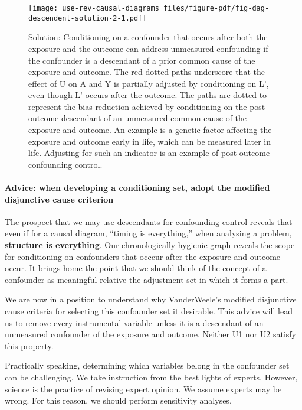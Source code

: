 \documentclass[
  singlecolumn,
  9pt]{article}
\let\oldparagraph\paragraph
\renewcommand{\paragraph}[1]{\oldparagraph{#1}\mbox{}}
\begin{document}
\begin{figure}

{\centering \texttt{[image: use-rev-causal-diagrams\_files/figure-pdf/fig-dag-descendent-solution-2-1.pdf]}

}

\caption{\label{fig-dag-descendent-solution-2}Solution: Conditioning on
a confounder that occurs after both the exposure and the outcome can
address unmeasured confounding if the confounder is a descendant of a
prior common cause of the exposure and outcome. The red dotted paths
underscore that the effect of U on A and Y is partially adjusted by
conditioning on L', even though L' occurs after the outcome. The paths
are dotted to represent the bias reduction achieved by conditioning on
the post-outcome descendant of an unmeasured common cause of the
exposure and outcome. An example is a genetic factor affecting the
exposure and outcome early in life, which can be measured later in life.
Adjusting for such an indicator is an example of post-outcome
confounding control.}

\end{figure}

\paragraph{Advice: when developing a conditioning set, adopt the
modified disjunctive cause
criterion}\label{advice-when-developing-a-conditioning-set-adopt-the-modified-disjunctive-cause-criterion}

The prospect that we may use descendants for confounding control reveals
that even if for a causal diagram, ``timing is everything,'' when
analysing a problem, \textbf{structure is everything}. Our
chronologically hygienic graph reveals the scope for conditioning on
confounders that occcur after the exposure and outcome occur. It brings
home the point that we should think of the concept of a confounder as
meaningful relative the adjustment set in which it forms a part.

We are now in a position to understand why VanderWeele's modified
disjunctive cause criteria for selecting this confounder set it
desirable. This advice will lead us to remove every instrumental
variable unless it is a descendant of an unmeasured confounder of the
exposure and outcome. Neither U1 nor U2 satisfy this property.

Practically speaking, determining which variables belong in the
confounder set can be challenging. We take instruction from the best
lights of experts. However, science is the practice of revising expert
opinion. We assume experts may be wrong. For this reason, we should
perform sensitivity analyses.
\end{document}
